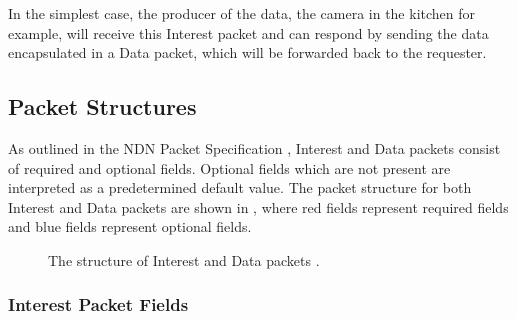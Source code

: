 In the simplest case, the producer of the data, the camera in the kitchen for example, will receive this Interest packet and can respond by sending the data encapsulated in a Data packet, which will be forwarded back to the requester.



\subsection{Packet Structures}\label{sec:ndn-packet-structure}
As outlined in the NDN Packet Specification \cite{ndn-packet-spec}, Interest and Data packets consist of required and optional fields. Optional fields which are not present are interpreted as a predetermined default value. The packet structure for both Interest and Data packets are shown in , where red fields represent required fields and blue fields represent optional fields.

\begin{figure}[H]
    \centering
    \caption{The structure of Interest and Data packets \cite{ndn}.}
    \label{fig:ndn-packet-structure}
\end{figure}

\vspace{5mm}
\subsubsection{Interest Packet Fields}

